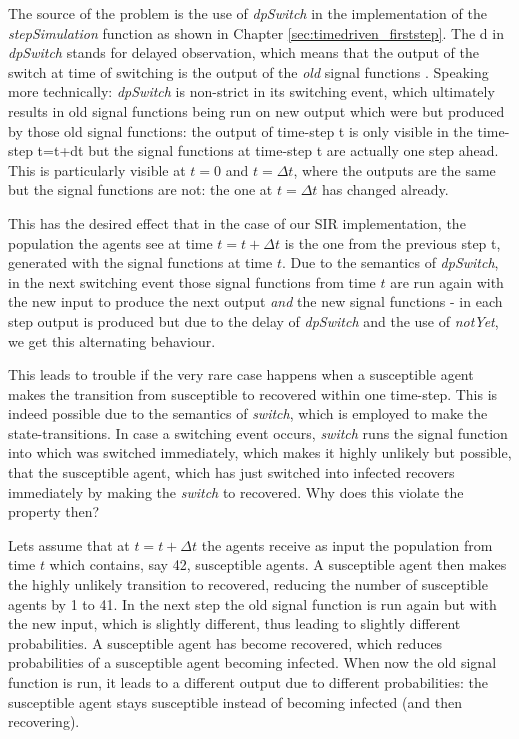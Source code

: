 \medskip

The source of the problem is the use of \textit{dpSwitch} in the implementation of the \textit{stepSimulation} function as shown in Chapter \ref{sec:timedriven_firststep}. The d in \textit{dpSwitch} stands for delayed observation, which means that the output of the switch at time of switching is the output of the \textit{old} signal functions \cite{courtney_yampa_2003}. Speaking more technically: \textit{dpSwitch} is non-strict in its switching event, which ultimately results in old signal functions being run on new output which were but produced by those old signal functions: the output of time-step t is only visible in the time-step t=t+dt but the signal functions at time-step t are actually one step ahead. This is particularly visible at $t = 0$ and $t = \Delta t$, where the outputs are the same but the signal functions are not: the one at $t = \Delta t$ has changed already.

This has the desired effect that in the case of our SIR implementation, the population the agents see at time $t = t + \Delta t$ is the one from the previous step t, generated with the signal functions at time $t$. Due to the semantics of \textit{dpSwitch}, in the next switching event those signal functions from time $t$ are run again with the new input to produce the next output \textit{and} the new signal functions - in each step output is produced but due to the delay of \textit{dpSwitch} and the use of \textit{notYet}, we get this alternating behaviour.

This leads to trouble if the very rare case happens when a susceptible agent makes the transition from susceptible to recovered within one time-step. This is indeed possible due to the semantics of \textit{switch}, which is employed to make the state-transitions. In case a switching event occurs, \textit{switch} runs the signal function into which was switched immediately, which makes it highly unlikely but possible, that the susceptible agent, which has just switched into infected  recovers immediately by making the \textit{switch} to recovered. Why does this violate the property then?

\medskip

Lets assume that at $t = t + \Delta t$ the agents receive as input the population from time $t$ which contains, say 42, susceptible agents. A susceptible agent then makes the highly unlikely transition to recovered, reducing the number of susceptible agents by 1 to 41. In the next step the old signal function is run again but with the new input, which is slightly different, thus leading to slightly different probabilities. A susceptible agent has become recovered, which reduces probabilities of a susceptible agent becoming infected. When now the old signal function is run, it leads to a different output due to different probabilities: the susceptible agent stays susceptible instead of becoming infected (and then recovering). 


